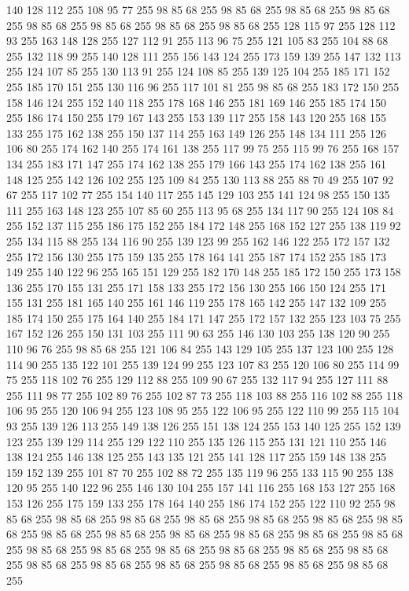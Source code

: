 140 128 112 255 108 95 77 255 98 85 68 255 98 85 68 255 98 85 68 255 98 85 68 255 98 85 68 255 98 85 68 255 98 85 68 255 98 85 68 255 128 115 97 255 128 112 93 255 163 148 128 255 127 112 91 255 113 96 75 255 121 105 83 255 104 88 68 255 132 118 99 255 140 128 111 255 156 143 124 255 173 159 139 255 147 132 113 255 124 107 85 255 130 113 91 255 124 108 85 255 139 125 104 255 185 171 152 255 185 170 151 255 130 116 96 255 117 101 81 255 98 85 68 255 183 172 150 255 158 146 124 255 152 140 118 255 178 168 146 255 181 169 146 255 185 174 150 255 186 174 150 255 179 167 143 255 153 139 117 255 158 143 120 255 168 155 133 255 175 162 138 255 150 137 114 255 163 149 126 255 148 134 111 255 126 106 80 255 174 162 140 255 174 161 138 255 117 99 75 255 115 99 76 255 168 157 134 255 183 171 147 255 174 162 138 255 179 166 143 255 174 162 138 255 161 148 125 255 142 126 102 255 125 109 84 255 130 113 88 255 88 70 49 255 107 92 67 255 117 102 77 255 154 140 117 255
145 129 103 255 141 124 98 255 150 135 111 255 163 148 123 255 107 85 60 255 113 95 68 255 134 117 90 255 124 108 84 255 152 137 115 255 186 175 152 255 184 172 148 255 168 152 127 255 138 119 92 255 134 115 88 255 134 116 90 255 139 123 99 255 162 146 122 255 172 157 132 255 172 156 130 255 175 159 135 255 178 164 141 255 187 174 152 255 185 173 149 255 140 122 96 255 165 151 129 255 182 170 148 255 185 172 150 255 173 158 136 255 170 155 131 255 171 158 133 255 172 156 130 255 166 150 124 255 171 155 131 255 181 165 140 255 161 146 119 255 178 165 142 255 147 132 109 255 185 174 150 255 175 164 140 255 184 171 147 255 172 157 132 255 123 103 75 255 167 152 126 255 150 131 103 255 111 90 63 255 146 130 103 255 138 120 90 255 110 96 76 255 98 85 68 255 121 106 84 255 143 129 105 255 137 123 100 255 128 114 90 255 135 122 101 255 139 124 99 255 123 107 83 255 120 106 80 255 114 99 75 255 118 102 76 255 129 112 88 255 109 90 67 255 132 117 94 255 127 111 88 255 111 98 77 255
102 89 76 255 102 87 73 255 118 103 88 255 116 102 88 255 118 106 95 255 120 106 94 255 123 108 95 255 122 106 95 255 122 110 99 255 115 104 93 255 139 126 113 255 149 138 126 255 151 138 124 255 153 140 125 255 152 139 123 255 139 129 114 255 129 122 110 255 135 126 115 255 131 121 110 255 146 138 124 255 146 138 125 255 143 135 121 255 141 128 117 255 159 148 138 255 159 152 139 255 101 87 70 255 102 88 72 255 135 119 96 255 133 115 90 255 138 120 95 255 140 122 96 255 146 130 104 255 157 141 116 255 168 153 127 255 168 153 126 255 175 159 133 255 178 164 140 255 186 174 152 255 122 110 92 255 98 85 68 255 98 85 68 255 98 85 68 255 98 85 68 255 98 85 68 255 98 85 68 255 98 85 68 255 98 85 68 255 98 85 68 255 98 85 68 255 98 85 68 255 98 85 68 255 98 85 68 255 98 85 68 255 98 85 68 255 98 85 68 255 98 85 68 255 98 85 68 255 98 85 68 255 98 85 68 255 98 85 68 255 98 85 68 255 98 85 68 255 98 85 68 255 98 85 68 255
